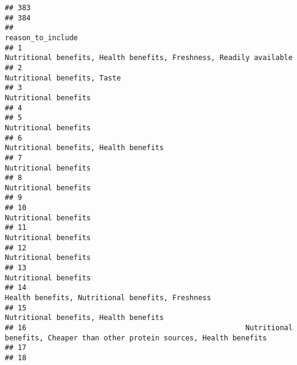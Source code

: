\documentclass[
]{article}
\begin{document}
\begin{verbatim}
## 383                                                                
## 384                                                                
##                                                                                                              reason_to_include
## 1                                                          Nutritional benefits, Health benefits, Freshness, Readily available
## 2                                                                                                  Nutritional benefits, Taste
## 3                                                                                                         Nutritional benefits
## 4                                                                                                                             
## 5                                                                                                         Nutritional benefits
## 6                                                                                        Nutritional benefits, Health benefits
## 7                                                                                                         Nutritional benefits
## 8                                                                                                         Nutritional benefits
## 9                                                                                                                             
## 10                                                                                                        Nutritional benefits
## 11                                                                                                        Nutritional benefits
## 12                                                                                                        Nutritional benefits
## 13                                                                                                        Nutritional benefits
## 14                                                                            Health benefits, Nutritional benefits, Freshness
## 15                                                                                       Nutritional benefits, Health benefits
## 16                                                   Nutritional benefits, Cheaper than other protein sources, Health benefits
## 17                                                                                                                            
## 18                                                                                                                            

\end{verbatim}
\end{document}

